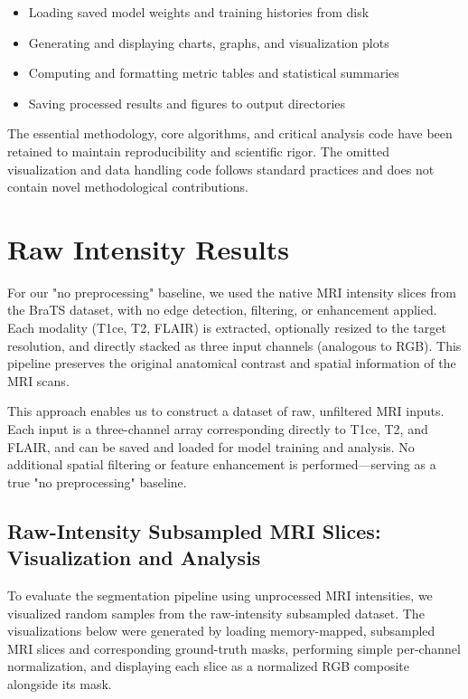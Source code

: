 \begin{itemize}
    \item Loading saved model weights and training histories from disk
    \item Generating and displaying charts, graphs, and visualization plots
    \item Computing and formatting metric tables and statistical summaries
    \item Saving processed results and figures to output directories
\end{itemize}

The essential methodology, core algorithms, and critical analysis code have been retained to maintain reproducibility and scientific rigor. The omitted visualization and data handling code follows standard practices and does not contain novel methodological contributions.

\section{Raw Intensity Results}

For our "no preprocessing" baseline, we used the native MRI intensity slices from the BraTS dataset, with no edge detection, filtering, or enhancement applied. Each modality (T1ce, T2, FLAIR) is extracted, optionally resized to the target resolution, and directly stacked as three input channels (analogous to RGB). This pipeline preserves the original anatomical contrast and spatial information of the MRI scans.

This approach enables us to construct a dataset of raw, unfiltered MRI inputs. Each input is a three-channel array corresponding directly to T1ce, T2, and FLAIR, and can be saved and loaded for model training and analysis. No additional spatial filtering or feature enhancement is performed—serving as a true "no preprocessing" baseline.




\subsection{Raw-Intensity Subsampled MRI Slices: Visualization and Analysis}

To evaluate the segmentation pipeline using unprocessed MRI intensities, we visualized random samples from the raw-intensity subsampled dataset. The visualizations below were generated by loading memory-mapped, subsampled MRI slices and corresponding ground-truth masks, performing simple per-channel normalization, and displaying each slice as a normalized RGB composite alongside its mask.

